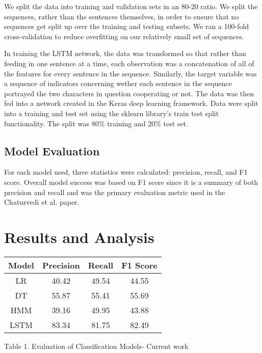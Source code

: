 \documentclass[11pt,a4paper]{article}
\begin{document}
We split the data into training and validation sets in an 80-20 ratio. We split the sequences, rather than the sentences themselves, in order to ensure that no sequences get split up over the training and testing subsets. We ran a 100-fold cross-validation to reduce overfitting on our relatively small set of sequences.

In training the LSTM network, the data was transformed so that rather than feeding in one sentence at a time, each observation was a concatenation of all of the features for every sentence in the sequence. Similarly, the target variable was a sequence of indicators concerning wether each sentence in the sequence portrayed the two characters in question cooperating or not. The data was then fed into a network created in the Keras deep learning framework. Data were split into a training and test set using the sklearn library's train test split functionality. The split was 80\% training and 20\% test set.

\subsection{Model Evaluation}

For each model used, three statistics were calculated: precision, recall, and F1 score. Overall model success was based on F1 score since it is a summary of both precision and recall and was the primary evaluation metric used in the Chaturvedi et al. paper.

\section{Results and Analysis}

\begin{center}
 \begin{tabular}{||c c c c||} 
 \hline
 Model & Precision & Recall & F1 Score \\ [0.5ex] 
 \hline\hline
 LR & 40.42 & 49.54 & 44.55 \\ 
 \hline
 DT & 55.87 & 55.41 & 55.69 \\
 \hline
 HMM & 39.16 & 49.95 & 43.88 \\
 \hline
 LSTM & 83.34 & 81.75 & 82.49 \\
 \hline
\end{tabular}
\end{center}
\caption{Table 1. Evaluation of Classification Models- Current work}
\label{table:1}
\end{document}
